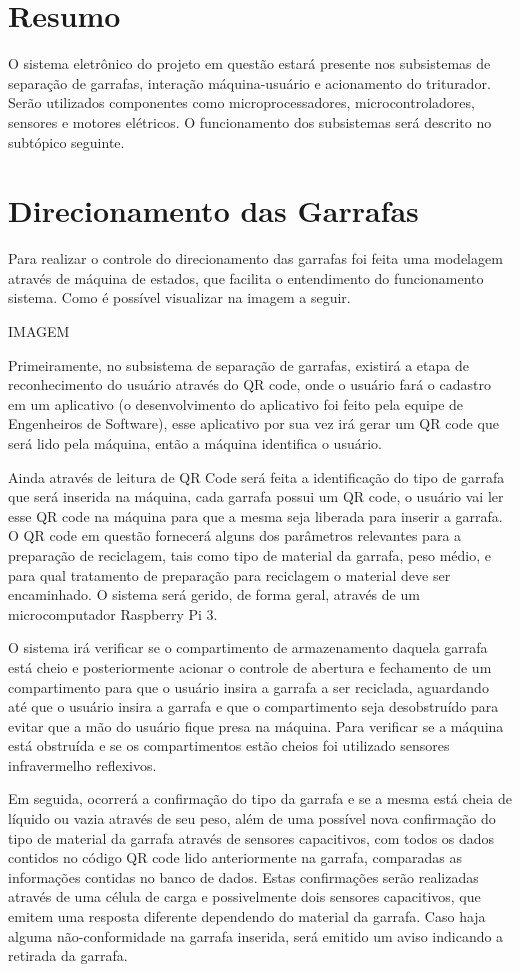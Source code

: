 \section{Resumo}
O sistema eletrônico do projeto em questão estará presente nos subsistemas de separação de garrafas, interação máquina-usuário e acionamento do triturador. Serão utilizados componentes como microprocessadores, microcontroladores, sensores e motores elétricos. O funcionamento dos subsistemas será descrito no subtópico seguinte.

\section{Direcionamento das Garrafas}
Para realizar o controle do direcionamento das garrafas foi feita uma modelagem através de máquina de estados, que facilita o entendimento do funcionamento sistema. Como é possível visualizar na imagem a seguir.

IMAGEM

Primeiramente, no subsistema de separação de garrafas, existirá a etapa de reconhecimento do usuário através do QR code, onde o usuário fará o cadastro em um aplicativo (o desenvolvimento do aplicativo foi feito pela equipe de Engenheiros de Software), esse aplicativo por sua vez irá gerar um QR code que será lido pela máquina, então a máquina identifica o usuário. 

Ainda através de leitura de QR Code será feita a identificação do tipo de garrafa que será inserida na máquina, cada garrafa possui um QR code, o usuário vai ler esse QR code na máquina para que a mesma seja liberada para inserir a garrafa. O QR code em questão fornecerá alguns dos parâmetros relevantes para a preparação de reciclagem, tais como tipo de material da garrafa, peso médio, e para qual tratamento de preparação para reciclagem o material deve ser encaminhado. O sistema será gerido, de forma geral, através de um microcomputador Raspberry Pi 3.
 
O sistema irá verificar se o compartimento de armazenamento daquela garrafa está cheio e posteriormente acionar o controle de abertura e fechamento de um compartimento para que o usuário insira a garrafa a ser reciclada, aguardando até que o usuário insira a garrafa e que o compartimento seja desobstruído para evitar que a mão do usuário fique presa na máquina. Para verificar se a máquina está obstruída e se os compartimentos estão cheios foi utilizado sensores infravermelho reflexivos. 
 
Em seguida, ocorrerá a confirmação do tipo da garrafa e se a mesma está cheia de líquido ou vazia através de seu peso, além de uma possível nova confirmação do tipo de material da garrafa através de sensores capacitivos, com todos os dados contidos no código QR code lido anteriormente na garrafa, comparadas as informações contidas no banco de dados.  Estas confirmações serão realizadas através de uma célula de carga e possivelmente dois sensores capacitivos, que emitem uma resposta diferente dependendo do material da garrafa. Caso haja alguma não-conformidade na garrafa inserida, será emitido um aviso indicando a retirada da garrafa.
 
